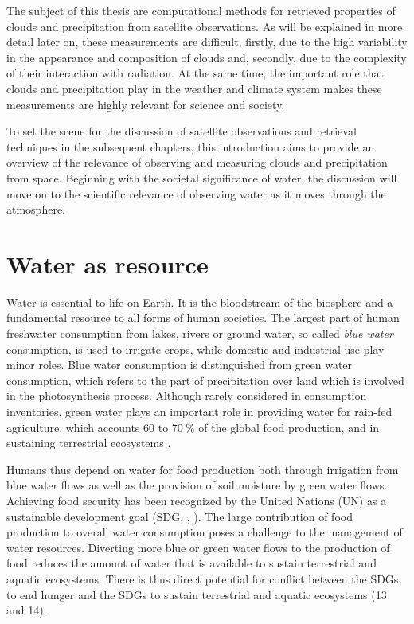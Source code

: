 The subject of this thesis are computational methods for retrieved properties of
clouds and precipitation from satellite observations. As will be explained in
more detail later on, these measurements are difficult, firstly, due to the high
variability in the appearance and composition of clouds and, secondly, due to
the complexity of their interaction with radiation. At the same time, the
important role that clouds and precipitation play in the weather and climate
system makes these measurements are highly relevant for science and society.

To set the scene for the discussion of satellite observations and retrieval
techniques in the subsequent chapters, this introduction aims to provide an
overview of the relevance of observing and measuring clouds and precipitation
from space. Beginning with the societal significance of water, the discussion
will move on to the scientific relevance of observing water as it moves through
the atmosphere.

\section{Water as resource}

Water is essential to life on Earth. It is the bloodstream of the biosphere
\citep{falkenmark04} and a fundamental resource to all forms of human
societies. The largest part of human freshwater consumption from lakes, rivers
or ground water, so called \textit{blue water} consumption, is used to irrigate
crops, while domestic and industrial use play minor roles. Blue water
consumption is distinguished from green water consumption, which refers to the
part of precipitation over land which is involved in the photosynthesis process.
Although rarely considered in consumption inventories, green water plays an
important role in providing water for rain-fed agriculture, which accounts $60$
to $\SI{70}{\percent}$ of the global food production, and in sustaining
terrestrial ecosystems \citep{falkenmark04}.

Humans thus depend on water for food production both through irrigation from
blue water flows as well as the provision of soil moisture by green water flows.
Achieving food security has been recognized by the United Nations (UN) as a
sustainable development goal (SDG, \citeauthor{sdg}, \citeyear{sdg}). The large
contribution of food production to overall water consumption poses a challenge
to the management of water resources. Diverting more blue or green water flows
to the production of food reduces the amount of water that is available to
sustain terrestrial and aquatic ecosystems. There is thus direct potential for
conflict between the SDGs to end hunger and the SDGs to sustain terrestrial and
aquatic ecosystems (13 and 14).

